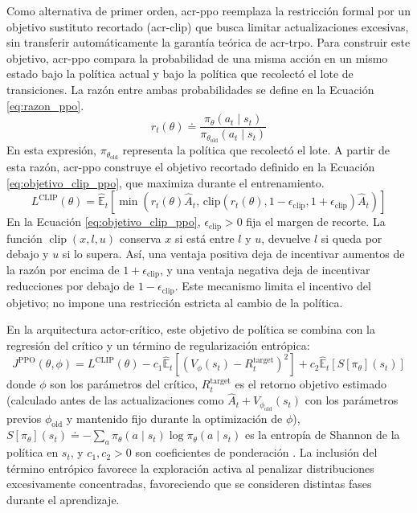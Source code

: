 Como alternativa de primer orden, \acrshort{acr-ppo} \cite{schulman2017ppo} reemplaza la restricción formal por un objetivo sustituto recortado (\acrshort{acr-clip}) que busca limitar actualizaciones excesivas, sin transferir automáticamente la garantía teórica de \acrshort{acr-trpo}. Para construir este objetivo, \acrshort{acr-ppo} compara la probabilidad de una misma acción en un mismo estado bajo la política actual y bajo la política que recolectó el lote de transiciones. La razón entre ambas probabilidades se define en la Ecuación \eqref{eq:razon_ppo}.
\begin{equation}
    r_t(\theta) \doteq \frac{\pi_\theta(a_t \mid s_t)}{\pi_{\theta_{\text{old}}}(a_t \mid s_t)}
    \label{eq:razon_ppo}
\end{equation}
En esta expresión, $\pi_{\theta_{\text{old}}}$ representa la política que recolectó el lote. A partir de esta razón, \acrshort{acr-ppo} construye el objetivo recortado definido en la Ecuación \eqref{eq:objetivo_clip_ppo}, que maximiza durante el entrenamiento.
\begin{equation}
    L^{\text{CLIP}}(\theta) = \hat{\mathbb{E}}_t \left[ \min\left( r_t(\theta) \hat{A}_t, \, \text{clip}(r_t(\theta), 1-\epsilon_{\mathrm{clip}}, 1+\epsilon_{\mathrm{clip}}) \hat{A}_t \right) \right]
    \label{eq:objetivo_clip_ppo}
\end{equation}
En la Ecuación \eqref{eq:objetivo_clip_ppo}, $\epsilon_{\mathrm{clip}}>0$ fija el margen de recorte. La función $\operatorname{clip}(x,l,u)$ conserva $x$ si está entre $l$ y $u$, devuelve $l$ si queda por debajo y $u$ si lo supera. Así, una ventaja positiva deja de incentivar aumentos de la razón por encima de $1+\epsilon_{\mathrm{clip}}$, y una ventaja negativa deja de incentivar reducciones por debajo de $1-\epsilon_{\mathrm{clip}}$. Este mecanismo limita el incentivo del objetivo; no impone una restricción estricta al cambio de la política.

En la arquitectura actor-crítico, este objetivo de política se combina con la regresión del crítico y un término de regularización entrópica:
\begin{equation}
    J^{\text{PPO}}(\theta, \phi) = L^{\text{CLIP}}(\theta) - c_1 \hat{\mathbb{E}}_t \left[ \left( V_\phi(s_t) - R_t^{\text{target}} \right)^2 \right] + c_2 \hat{\mathbb{E}}_t\left[S[\pi_\theta](s_t)\right]
    \label{eq:objetivo_combinado_ppo}
\end{equation}
donde $\phi$ son los parámetros del crítico, $R_t^{\text{target}}$ es el retorno objetivo estimado (calculado antes de las actualizaciones como $\hat{A}_t + V_{\phi_{\text{old}}}(s_t)$ con los parámetros previos $\phi_{\text{old}}$ y mantenido fijo durante la optimización de $\phi$), $S[\pi_\theta](s_t) \doteq -\sum_a \pi_\theta(a \mid s_t) \log \pi_\theta(a \mid s_t)$ es la entropía de Shannon de la política en $s_t$, y $c_1, c_2 > 0$ son coeficientes de ponderación \cite{schulman2017ppo}. La inclusión del término entrópico favorece la exploración activa al penalizar distribuciones excesivamente concentradas, favoreciendo que se consideren distintas fases durante el aprendizaje.

